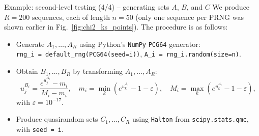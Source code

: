\documentclass[aspectratio=169]{beamer}
\begin{document}
\begin{frame}{Example: second-level testing (4/4) -- generating sets $A$, $B$, and $C$}
We produce $R = 200$ sequences, each of length $n = 50$
(only one sequence per PRNG was shown earlier in Fig.~\ref{fig:chi2_ks_points}).
The procedure is as follows:
\begin{itemize}
 \item Generate $A_1,\ldots,A_R$ using Python's \texttt{NumPy} \texttt{PCG64} generator:\\
 \texttt{rng\_i = default\_rng(PCG64(seed=i))}, \quad
 \texttt{A\_i = rng\_i.random(size=n)}.
 \pause
 \item Obtain $B_1,\ldots,B_R$ by transforming $A_1,\ldots,A_R$:
 \[
 u_j^{B_i} = \frac{e^{u_j^{A_i}} - m_i}{M_i - m_i}, \quad
 m_i = \min_k(e^{u_k^{A_i}} - 1 - \varepsilon),\quad
 M_i = \max_k(e^{u_k^{A_i}} - 1 - \varepsilon),
 \]
 with $\varepsilon = 10^{-17}$.
 \pause
 \item Produce quasirandom sets $C_1,\ldots,C_R$ using
 \texttt{Halton} from \texttt{scipy.stats.qmc}, with \texttt{seed = i}.
\end{itemize}


\end{frame}




%
\end{document}
